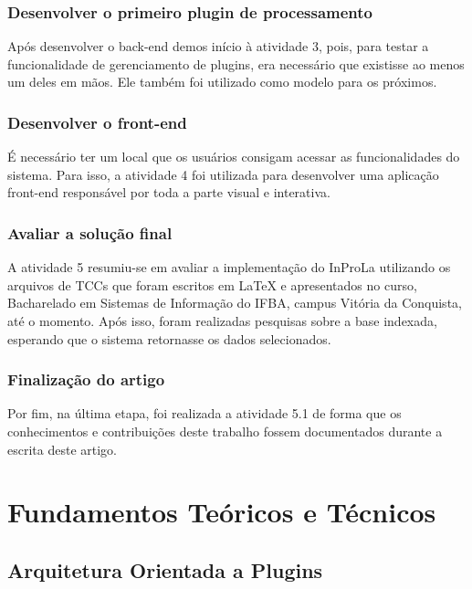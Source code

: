 \documentclass[12pt]{article}
\begin{document}
\subsubsection{Desenvolver o primeiro plugin de processamento}

Após desenvolver o back-end demos início à atividade 3, pois, para testar a funcionalidade de gerenciamento de plugins, era necessário que existisse ao menos um deles em mãos. Ele também foi utilizado como modelo para os próximos.

\subsubsection{Desenvolver o front-end}

É necessário ter um local que os usuários consigam acessar as funcionalidades do sistema. Para isso, a atividade 4 foi utilizada para desenvolver uma aplicação front-end responsável por toda a parte visual e interativa.

\subsubsection{Avaliar a solução final}

A atividade 5 resumiu-se em avaliar a implementação do InProLa utilizando os arquivos de TCCs que foram escritos em LaTeX e apresentados no curso, Bacharelado em Sistemas de Informação do IFBA, campus Vitória da Conquista, até o momento. Após isso, foram realizadas pesquisas sobre a base indexada, esperando que o sistema retornasse os dados selecionados.

\subsubsection{Finalização do artigo}

Por fim, na última etapa, foi realizada a atividade 5.1 de forma que os conhecimentos e contribuições deste trabalho fossem documentados durante a escrita deste artigo.

\section{Fundamentos Teóricos e Técnicos}

\subsection{Arquitetura Orientada a Plugins}
\end{document}
